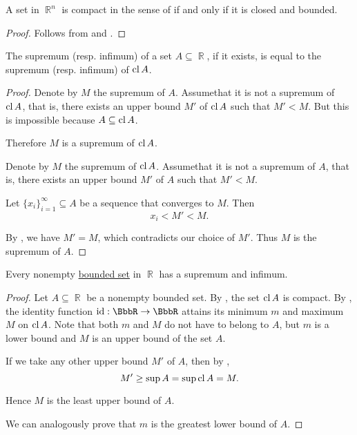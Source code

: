 \begin{theorem}\label{thm:heine_borel}
  A set in \( \BbbR^n \) is compact in the sense of  if and only if it is closed and bounded.
\end{theorem}
\begin{proof}
  Follows from  and .
\end{proof}

\begin{proposition}\label{thm:real_supremum_of_closure}
  The supremum (resp. infimum) of a set \( A \subseteq \BbbR \), if it exists, is equal to the supremum (resp. infimum) of \( \operatorname{cl} A \).
\end{proposition}
\begin{proof}
  \SufficiencySubProof Denote by \( M \) the supremum of \( A \). Assume\DNE that it is not a supremum of \( \operatorname{cl} A \), that is, there exists an upper bound \( M' \) of \( \operatorname{cl} A \) such that \( M' < M \). But this is impossible because \( A \subseteq \operatorname{cl} A \).

  Therefore \( M \) is a supremum of \( \operatorname{cl} A \).

  \NecessitySubProof Denote by \( M \) the supremum of \( \operatorname{cl} A \). Assume\DNE that it is not a supremum of \( A \), that is, there exists an upper bound \( M' \) of \( A \) such that \( M' < M \).

  Let \( \{ x_i \}_{i=1}^\infty \subseteq A \) be a sequence that converges to \( M \). Then
  \begin{equation*}
    x_i < M' < M.
  \end{equation*}

  By , we have \( M' = M \), which contradicts our choice of \( M' \). Thus \( M \) is the supremum of \( A \).
\end{proof}

\begin{proposition}\label{thm:real_bounded_set_has_supremum}
  Every nonempty \hyperref[def:metric_space/bounded_set]{bounded set} in \( \BbbR \) has a supremum and infimum.
\end{proposition}
\begin{proof}
  Let \( A \subseteq \BbbR \) be a nonempty bounded set. By , the set \( \operatorname{cl} A \) is compact. By , the identity function \( \id: \BbbR \to \BbbR \) attains its minimum \( m \) and maximum \( M \) on \( \operatorname{cl} A \). Note that both \( m \) and \( M \) do not have to belong to \( A \), but \( m \) is a lower bound and \( M \) is an upper bound of the set \( A \).

  If we take any other upper bound \( M' \) of \( A \), then by ,
  \begin{equation*}
    M' \geq \sup A = \sup \operatorname{cl} A = M.
  \end{equation*}

  Hence \( M \) is the least upper bound of \( A \).

  We can analogously prove that \( m \) is the greatest lower bound of \( A \).
\end{proof}
